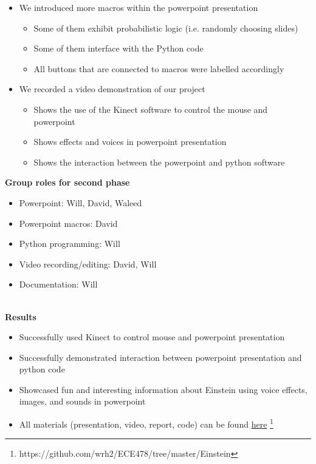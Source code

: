 \documentclass[12pt]{article}
\begin{document}
\begin{description}
\begin{itemize}
\begin{itemize}
\begin{itemize}
							\item There is also a README located \href{https://github.com/wrh2/ECE478/blob/master/Einstein/README.md}{here} \footnote{https://github.com/wrh2/ECE478/blob/master/Einstein/README.md}
						\end{itemize}
				\end{itemize}
			\item We introduced more macros within the powerpoint presentation 
				\begin{itemize}
					\item Some of them exhibit probabilistic logic (i.e. randomly choosing slides)
					\item Some of them interface with the Python code
					\item All buttons that are connected to macros were labelled accordingly
				\end{itemize}
			\item We recorded a video demonstration of our project
				\begin{itemize}
					\item Shows the use of the Kinect software to control the mouse and powerpoint
					\item Shows effects and voices in powerpoint presentation
					\item Shows the interaction between the powerpoint and python software
				\end{itemize}
		\end{itemize}
		\textbf{Group roles for second phase}
		\begin{itemize}
			\item Powerpoint: Will, David, Waleed
			\item Powerpoint macros: David
			\item Python programming: Will
			\item Video recording/editing: David, Will
			\item Documentation: Will
		\end{itemize} \hfill \\
		\newpage
		\textbf{Results}
		\begin{itemize}
			\item Successfully used Kinect to control mouse and powerpoint presentation
			\item Successfully demonstrated interaction between powerpoint presentation and python code
			\item Showcased fun and interesting information about Einstein using voice effects, images, and sounds in powerpoint
			\item All materials (presentation, video, report, code) can be found \href{https://github.com/wrh2/ECE478/tree/master/Einstein}{here} \footnote{https://github.com/wrh2/ECE478/tree/master/Einstein}
		\end{itemize}
		
\end{description}
\end{document}
